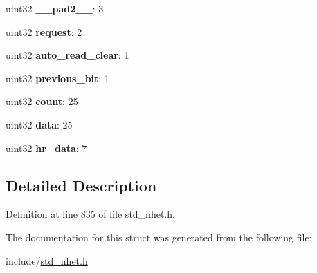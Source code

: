 \begin{DoxyCompactItemize}
\item 
\mbox{\label{structpcnt__format_ab1dfcd1a2df46a25f41e06be704bc878}} 
uint32 {\bfseries \+\_\+\+\_\+pad2\+\_\+\+\_\+}\+: 3
\item 
\mbox{\label{structpcnt__format_a91dc8723271d603d7dc38d92f101817d}} 
uint32 {\bfseries request}\+: 2
\item 
\mbox{\label{structpcnt__format_a4356f3672e46d4fb3918e2afca6af22e}} 
uint32 {\bfseries auto\+\_\+read\+\_\+clear}\+: 1
\item 
\mbox{\label{structpcnt__format_ac785f08374ee8ebc884f51d3d7f5408c}} 
uint32 {\bfseries previous\+\_\+bit}\+: 1
\item 
\mbox{\label{structpcnt__format_a0a286912daba6bc9ef9498b6281951aa}} 
uint32 {\bfseries count}\+: 25
\item 
\mbox{\label{structpcnt__format_adbe212caa03f71fdcb35e813ba710176}} 
uint32 {\bfseries data}\+: 25
\item 
\mbox{\label{structpcnt__format_a91e57c3bbf565deea13d0208ece819dd}} 
uint32 {\bfseries hr\+\_\+data}\+: 7
\end{DoxyCompactItemize}


\subsection{Detailed Description}


Definition at line 835 of file std\+\_\+nhet.\+h.



The documentation for this struct was generated from the following file\+:\begin{DoxyCompactItemize}
\item 
include/\mbox{\hyperlink{std__nhet_8h}{std\+\_\+nhet.\+h}}\end{DoxyCompactItemize}
